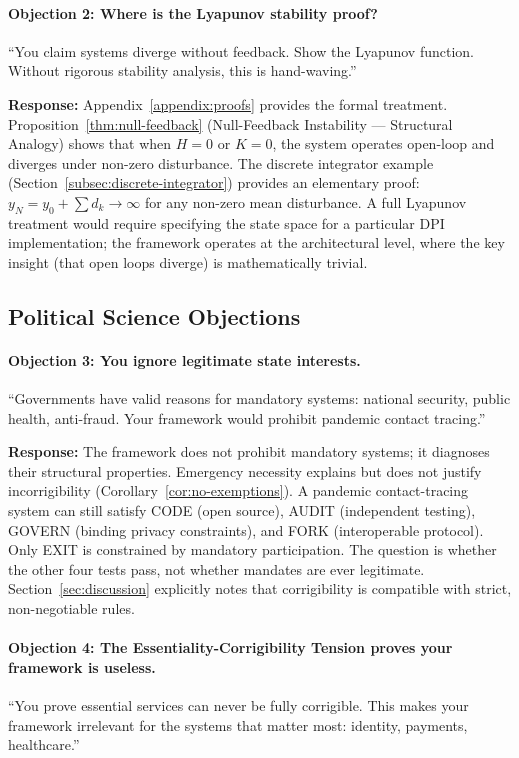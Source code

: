 \documentclass{article}
\begin{document}
\paragraph{Objection 2: Where is the Lyapunov stability proof?}
``You claim systems diverge without feedback. Show the Lyapunov function. Without rigorous stability analysis, this is hand-waving.''

\textbf{Response:} Appendix~\ref{appendix:proofs} provides the formal treatment. Proposition~\ref{thm:null-feedback} (Null-Feedback Instability --- Structural Analogy) shows that when $H=0$ or $K=0$, the system operates open-loop and diverges under non-zero disturbance. The discrete integrator example (Section~\ref{subsec:discrete-integrator}) provides an elementary proof: $y_N = y_0 + \sum d_k \to \infty$ for any non-zero mean disturbance. A full Lyapunov treatment would require specifying the state space for a particular DPI implementation; the framework operates at the architectural level, where the key insight (that open loops diverge) is mathematically trivial.

\subsection{Political Science Objections}

\paragraph{Objection 3: You ignore legitimate state interests.}
``Governments have valid reasons for mandatory systems: national security, public health, anti-fraud. Your framework would prohibit pandemic contact tracing.''

\textbf{Response:} The framework does not prohibit mandatory systems; it diagnoses their structural properties. Emergency necessity explains but does not justify incorrigibility (Corollary~\ref{cor:no-exemptions}). A pandemic contact-tracing system can still satisfy CODE (open source), AUDIT (independent testing), GOVERN (binding privacy constraints), and FORK (interoperable protocol). Only EXIT is constrained by mandatory participation. The question is whether the other four tests pass, not whether mandates are ever legitimate. Section~\ref{sec:discussion} explicitly notes that corrigibility is compatible with strict, non-negotiable rules.

\paragraph{Objection 4: The Essentiality-Corrigibility Tension proves your framework is useless.}
``You prove essential services can never be fully corrigible. This makes your framework irrelevant for the systems that matter most: identity, payments, healthcare.''
\end{document}
